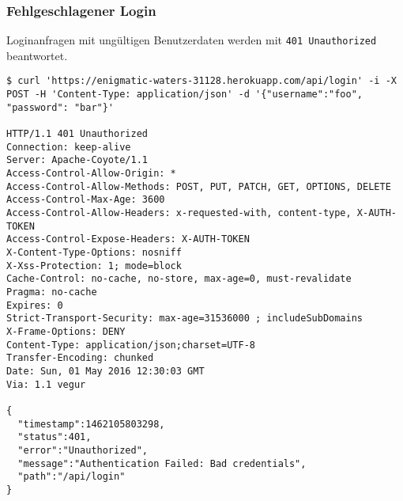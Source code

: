 \subsubsection{Fehlgeschlagener Login}
Loginanfragen mit ungültigen Benutzerdaten werden mit \colorbox{pregray}{\lstinline{401 Unauthorized}} beantwortet.
\vspace{2em}
\begin{lstlisting}
$ curl 'https://enigmatic-waters-31128.herokuapp.com/api/login' -i -X POST -H 'Content-Type: application/json' -d '{"username":"foo", "password": "bar"}'

HTTP/1.1 401 Unauthorized
Connection: keep-alive
Server: Apache-Coyote/1.1
Access-Control-Allow-Origin: *
Access-Control-Allow-Methods: POST, PUT, PATCH, GET, OPTIONS, DELETE
Access-Control-Max-Age: 3600
Access-Control-Allow-Headers: x-requested-with, content-type, X-AUTH-TOKEN
Access-Control-Expose-Headers: X-AUTH-TOKEN
X-Content-Type-Options: nosniff
X-Xss-Protection: 1; mode=block
Cache-Control: no-cache, no-store, max-age=0, must-revalidate
Pragma: no-cache
Expires: 0
Strict-Transport-Security: max-age=31536000 ; includeSubDomains
X-Frame-Options: DENY
Content-Type: application/json;charset=UTF-8
Transfer-Encoding: chunked
Date: Sun, 01 May 2016 12:30:03 GMT
Via: 1.1 vegur

{
  "timestamp":1462105803298,
  "status":401,
  "error":"Unauthorized",
  "message":"Authentication Failed: Bad credentials",
  "path":"/api/login"
}
\end{lstlisting}
